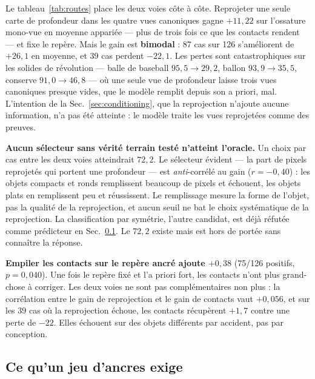 \documentclass[conference]{IEEEtran}
\begin{document}
Le tableau~\ref{tab:routes} place les deux voies côte à côte. Reprojeter une seule
carte de profondeur dans les quatre vues canoniques gagne $+11{,}22$ sur l'ossature
mono-vue en moyenne appariée --- plus de trois fois ce que les contacts rendent --- et
fixe le repère. Mais le gain est \textbf{bimodal} : 87 cas sur 126 s'améliorent de
$+26{,}1$ en moyenne, et 39 cas perdent $-22{,}1$. Les pertes sont catastrophiques sur
les solides de révolution --- balle de baseball $95{,}5 \rightarrow 29{,}2$, ballon
$93{,}9 \rightarrow 35{,}5$, conserve $91{,}0 \rightarrow 46{,}8$ --- où une seule vue
de profondeur laisse trois vues canoniques presque vides, que le modèle remplit depuis
son a priori, mal. L'intention de la Sec.~\ref{sec:conditioning}, que la reprojection
n'ajoute aucune information, n'a pas été atteinte : le modèle traite les vues
reprojetées comme des preuves.

\textbf{Aucun sélecteur sans vérité terrain testé n'atteint l'oracle.} Un choix par
cas entre les deux voies atteindrait $72{,}2$. Le sélecteur évident --- la part de
pixels reprojetés qui portent une profondeur --- est \emph{anti}-corrélé au gain
($r = -0{,}40$) : les objets compacts et ronds remplissent beaucoup de pixels et
échouent, les objets plats en remplissent peu et réussissent. Le remplissage mesure la
forme de l'objet, pas la qualité de la reprojection, et aucun seuil ne bat le choix
systématique de la reprojection. La classification par symétrie, l'autre candidat, est
déjà réfutée comme prédicteur en Sec.~\ref{sec:res-anchor}. Le $72{,}2$ existe mais
est hors de portée sans connaître la réponse.

\textbf{Empiler les contacts sur le repère ancré ajoute $+0{,}38$} (75/126 positifs,
$p = 0{,}040$). Une fois le repère fixé et l'a priori fort, les contacts n'ont plus
grand-chose à corriger. Les deux voies ne sont pas complémentaires non plus : la
corrélation entre le gain de reprojection et le gain de contacts vaut $+0{,}056$, et
sur les 39 cas où la reprojection échoue, les contacts récupèrent $+1{,}7$ contre une
perte de $-22$. Elles échouent sur des objets différents par accident, pas par
conception.

\subsection{Ce qu'un jeu d'ancres exige}
\label{sec:res-anchor}
\end{document}
